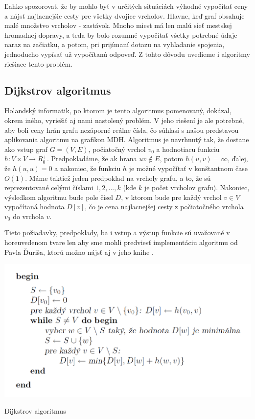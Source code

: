Ľahko spozorovať, že by mohlo byť v určitých situáciách výhodné vypočítať ceny a nájsť najlacnejšie cesty pre všetky dvojice vrcholov. Hlavne, keď graf obsahuje malé množstvo vrcholov - zastávok. Mnoho miest má len malú sieť mestskej hromadnej dopravy, a teda by bolo rozumné vypočítať všetky potrebné údaje naraz na začiatku, a potom, pri prijímaní dotazu na vyhľadanie spojenia, jednoducho vypísať už vypočítanú odpoveď. Z tohto dôvodu uvedieme i algoritmy riešiace tento problém.\newline

\subsection{Dijkstrov algoritmus}

Holandský informatik, po ktorom je tento algoritmus pomenovaný, dokázal, okrem iného, vyriešiť aj nami nastolený problém. V jeho riešení je ale potrebné, aby boli ceny hrán grafu nezáporné reálne čísla, čo súhlasí s našou predstavou aplikovania algoritmu na grafikon MDH. Algoritmus je navrhnutý tak, že dostane ako vstup graf $G = (V, E)$, počiatočný vrchol $v_{0}$ a hodnotiacu funkciu $h: V \times V \rightarrow R^{+}_{0}$. Predpokladáme, že ak hrana $uv \notin E$, potom $h(u,v) = \infty$, ďalej, že $h(u,u) = 0$ a nakoniec, že funkciu $h$ je možné vypočítať v konštantnom čase $O(1)$. Máme taktiež jeden predpoklad na vrcholy grafu, a to, že sú reprezentované celými číslami $1, 2, ..., k$ (kde $k$ je počet vrcholov grafu). Nakoniec, výsledkom algoritmu bude pole čísel $D$, v ktorom bude pre každý vrchol $v \in V$ vypočítaná hodnota $D [v]$, čo je cena najlacnejšej cesty z počiatočného vrchola $v_{0}$ do vrchola $v$.\newline

Tieto požiadavky, predpoklady, ba i vstup a výstup funkcie sú uvažované v horeuvedenom tvare len aby sme mohli predviesť implementáciu algoritmu od Pavla Ďuriša, ktorú možno nájsť aj v jeho knihe \cite[kapitola 2.2.1]{duris2009}.\newline

\begin{algorithm}[H]
  \includegraphics[width=\linewidth]{./images/Alg_Dijkstra.png}
  \caption{Dijkstrov algoritmus}
  \label{Alg_Dijkstra}
  \centering
\end{algorithm}

